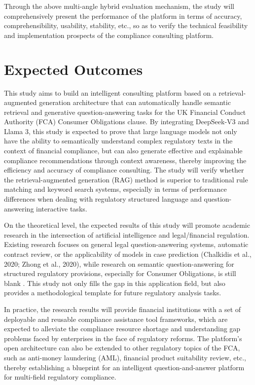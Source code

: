 \documentclass[a4paper,11pt]{article}
\begin{document}
Through the above multi-angle hybrid evaluation mechanism, the study will comprehensively present the performance of the platform in terms of accuracy, comprehensibility, usability, stability, etc., so as to verify the technical feasibility and implementation prospects of the compliance consulting platform.

\section{Expected Outcomes}

This study aims to build an intelligent consulting platform based on a retrieval-augmented generation architecture that can automatically handle semantic retrieval and generative question-answering tasks for the UK Financial Conduct Authority (FCA) Consumer Obligations clause. By integrating DeepSeek-V3 and Llama 3, this study is expected to prove that large language models not only have the ability to semantically understand complex regulatory texts in the context of financial compliance, but can also generate effective and explainable compliance recommendations through context awareness, thereby improving the efficiency and accuracy of compliance consulting. The study will verify whether the retrieval-augmented generation (RAG) method is superior to traditional rule matching and keyword search systems, especially in terms of performance differences when dealing with regulatory structured language and question-answering interactive tasks.

On the theoretical level, the expected results of this study will promote academic research in the intersection of artificial intelligence and legal/financial regulation. Existing research focuses on general legal question-answering systems, automatic contract review, or the applicability of models in case prediction (Chalkidis et al., 2020; Zhong et al., 2020), while research on semantic question-answering for structured regulatory provisions, especially for Consumer Obligations, is still blank \cite{zhang2023regtech}. This study not only fills the gap in this application field, but also provides a methodological template for future regulatory analysis tasks.

In practice, the research results will provide financial institutions with a set of deployable and reusable compliance assistance tool frameworks, which are expected to alleviate the compliance resource shortage and understanding gap problems faced by enterprises in the face of regulatory reforms. The platform's open architecture can also be extended to other regulatory topics of the FCA, such as anti-money laundering (AML), financial product suitability review, etc., thereby establishing a blueprint for an intelligent question-and-answer platform for multi-field regulatory compliance.
\end{document}
